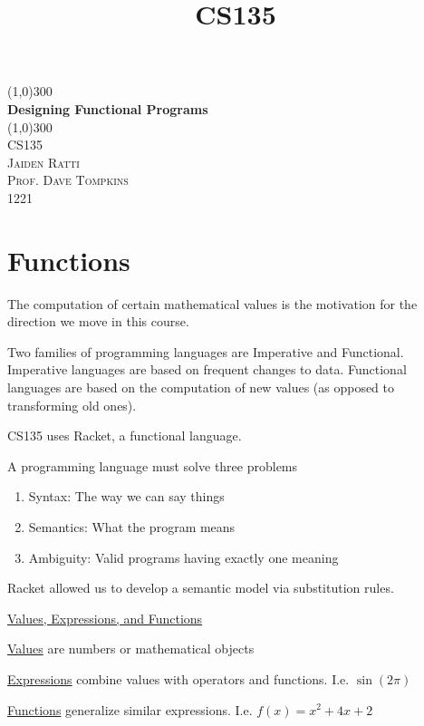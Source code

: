 \documentclass{article}
\title{CS135}
\begin{document}
\begin{titlepage}
	\begin{center}
    \line(1,0){300}\\
    [0.65cm]
	\huge{\bfseries Designing Functional Programs}\\
	\line(1,0){300}\\
	\textsc{\Large CS135}\\
	\textsc{\LARGE  Jaiden Ratti}\\
        \textsc{\Large Prof. Dave Tompkins}\\
        \Large 1221\\
	[5.5cm]
	\end{center}
\end{titlepage}

\tableofcontents

\pagebreak


\section{Functions}


The computation of certain mathematical values is the motivation for the direction we move in this course. 

Two families of programming languages are Imperative and Functional. Imperative languages are based on frequent changes to data. Functional languages are based on the computation of new values (as opposed to transforming old ones). 

CS135 uses Racket, a functional language. 

A programming language must solve three problems
\begin{enumerate}
    \item Syntax: The way we can say things
    \item Semantics: What the program means
    \item Ambiguity: Valid programs having exactly one meaning
\end{enumerate}

Racket allowed us to develop a semantic model via substitution rules. 

\underline{Values, Expressions, and Functions}

\underline{Values} are numbers or mathematical objects

\underline{Expressions} combine values with operators and functions. I.e. $\sin(2\pi)$

\underline{Functions} generalize similar expressions. I.e. $f(x) = x^2 + 4x + 2$
\end{document}
